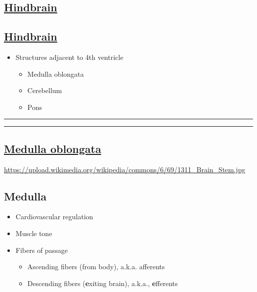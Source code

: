 \documentclass[]{article}
\providecommand{\tightlist}{%
  \setlength{\itemsep}{0pt}\setlength{\parskip}{0pt}}
\begin{document}
\subsection{\texorpdfstring{\href{https://en.wikipedia.org/wiki/File:EmbryonicBrain.svg}{Hindbrain}}{Hindbrain}}\label{hindbrain}

\subsection{\texorpdfstring{\href{https://en.wikipedia.org/wiki/File:EmbryonicBrain.svg}{Hindbrain}}{Hindbrain}}\label{hindbrain-1}

\begin{itemize}
\tightlist
\item
  Structures adjacent to 4th ventricle

  \begin{itemize}
  \tightlist
  \item
    Medulla oblongata
  \item
    Cerebellum
  \item
    Pons
  \end{itemize}
\end{itemize}

\begin{center}\rule{0.5\linewidth}{\linethickness}\end{center}

\begin{center}\rule{0.5\linewidth}{\linethickness}\end{center}

\subsection{\texorpdfstring{\href{https://en.wikipedia.org/wiki/Medulla_oblongata}{Medulla
oblongata}}{Medulla oblongata}}\label{medulla-oblongata}

\url{https://upload.wikimedia.org/wikipedia/commons/6/69/1311_Brain_Stem.jpg}

\subsection{Medulla}\label{medulla}

\begin{itemize}
\tightlist
\item
  Cardiovascular regulation
\item
  Muscle tone
\item
  Fibers of passage

  \begin{itemize}
  \tightlist
  \item
    Ascending fibers (from body), a.k.a. afferents
  \item
    Descending fibers (\textbf{e}xiting brain), a.k.a.,
    \textbf{e}fferents
  \end{itemize}
\end{itemize}
\end{document}
